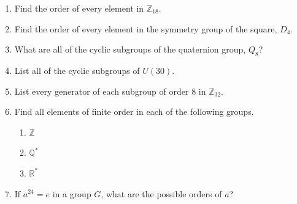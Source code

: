 {\begin{enumerate}
\begin{minipage}[t]{4.6in}
\begin{minipage}[t]{2.25in}
\begin{itemize}
 \item[{\bf (d)}]
 
 \item[{\bf (f)}]
 
\end{itemize}
\end{minipage}
\end{minipage}
 
\vspace{2pt}        %
 
 
\bf\item\rm		  %
Find the order of every element in ${\mathbb Z}_{18}$.
 
 
\bf\item\rm
Find the order of every element in the symmetry group of the square,
$D_4$.
 
 
\bf\item\rm
What are all of the cyclic subgroups of the quaternion group, $Q_8$? 
 
 
\bf\item\rm
List all of the cyclic subgroups of $U(30)$.
 
 
\bf\item\rm
List every generator of each subgroup of order 8 in ${\mathbb
Z}_{32}$.
 
 
\bf\item\rm
Find all elements of finite order in each of the following groups. 
\begin{enumerate}
 
 \bf\item\rm
${\mathbb Z}$
 
 \bf\item\rm
${\mathbb Q}^\ast$
 
 \bf\item\rm
${\mathbb R}^\ast$
 
\end{enumerate}
 
 
\bf\item\rm
If $a^{24} =e$ in a group $G$, what are the possible orders of $a$? 
 

\end{enumerate}}
